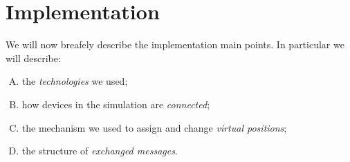 \section{Implementation}

We will now breafely describe the implementation main points. In particular we will describe:
	\begin{enumerate}[A.]
		\item the \textit{technologies} we used;
		\item how devices in the simulation are \textit{connected};
		\item the mechanism we used to assign and change \textit{virtual positions};
		\item the structure of \textit{exchanged messages}.
	\end{enumerate}




